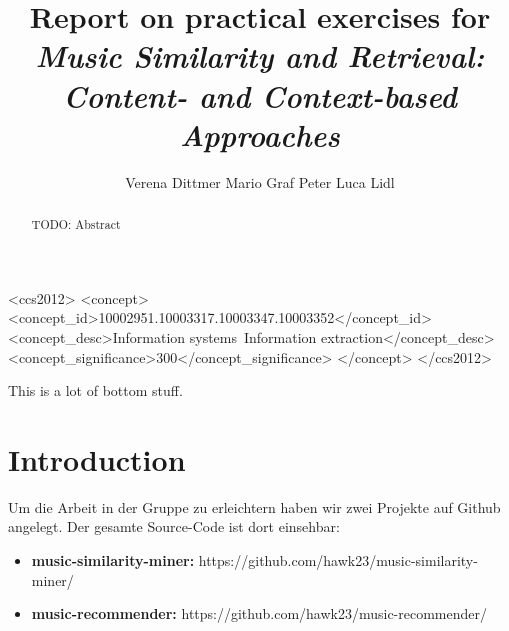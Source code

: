 \documentclass[prodmode,acmtecs]{acmsmall} %
\begin{document}

\title{Report on practical exercises for \emph{Music Similarity and Retrieval: Content- and Context-based Approaches}}
\author{
Verena Dittmer
Mario Graf
Peter Luca Lidl
}

\begin{abstract}
TODO: Abstract
\end{abstract}

%
%
\begin{CCSXML}
<ccs2012>
<concept>
<concept_id>10002951.10003317.10003347.10003352</concept_id>
<concept_desc>Information systems~Information extraction</concept_desc>
<concept_significance>300</concept_significance>
</concept>
</ccs2012>
\end{CCSXML}


%
%



\begin{bottomstuff}
This is a lot of bottom stuff.
\end{bottomstuff}

\maketitle


\section{Introduction}
Um die Arbeit in der Gruppe zu erleichtern haben wir zwei Projekte auf Github angelegt. Der gesamte Source-Code ist dort einsehbar:
\begin{itemize}
\item \textbf{music-similarity-miner: } https://github.com/hawk23/music-similarity-miner/
\item \textbf{music-recommender: } https://github.com/hawk23/music-recommender/
\end{itemize}
\end{document}

